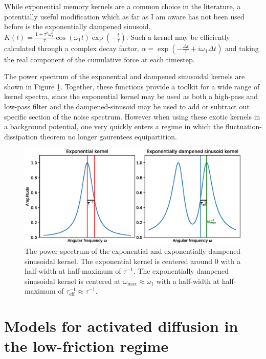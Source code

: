 \documentclass{article}
\begin{document}
While exponential memory kernels are a common choice in the literature, a potentially useful modification which as far as I am aware has not been used before is the exponentially dampened sinusoid, $K(t)=\frac{1+\tau^2\omega_1^2}{\tau}\cos(\omega_1t)\exp\left(-\frac{t}{\tau}\right)$. Such a kernel may be efficiently calculated through a complex decay factor, $\alpha=\exp\left(-\frac{\Delta{t}}{\tau} + i\omega_1\Delta{t}\right)$ and taking the real component of the cumulative force at each timestep. 

The power spectrum of the exponential and dampened sinusoidal kernels are shown in Figure \ref{fig:kernel_spectra}. Together, these functions provide a toolkit for a wide range of kernel spectra, since the exponential kernel may be used as both a high-pass and low-pass filter and the dampened-sinusoid may be used to add or subtract out specific section of the noise spectrum. However when using these exotic kernels in a background potential, one very quickly enters a regime in which the fluctuation-dissipation theorem no longer gaurentees equipartition. 

\begin{figure}
	\centering
	\includegraphics[width=1.0\textwidth]{kernel_spectra}
	\caption{The power spectrum of the exponential and exponentially dampened sinusoidal kernel. The exponential kernel is centered around $0$ with a half-width at half-maximum of $\tau^{-1}$. The exponentially dampened sinusoidal kernel is centered at $\omega_{\text{max}} \approx \omega_1$ with a half-width at half-maximum of $\tau_{\text{eff}}^{-1}\approx\tau^{-1}$.} 
	\label{fig:kernel_spectra}
\end{figure}


\section{Models for activated diffusion in the low-friction regime}
\end{document}
